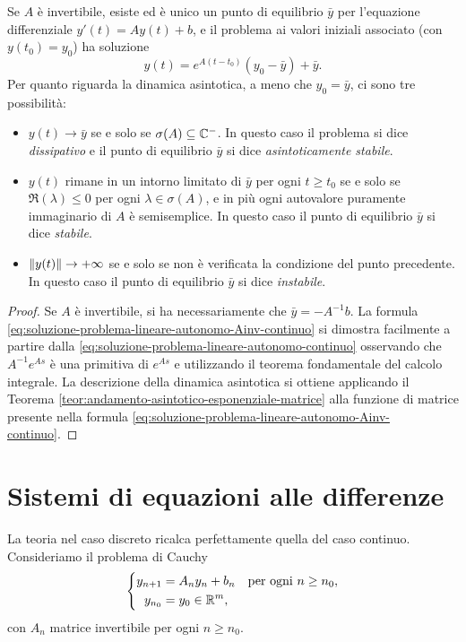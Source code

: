 \begin{teor} \label{teor:dinamica-asintotica-lineare-continuo}
Se $A$ è invertibile, esiste ed è unico un punto di equilibrio $\bar{y}$ per
l'equazione differenziale $y'(t) = A y(t) + b$, e il problema ai valori
iniziali associato (con $y(t_0) = y_0$) ha soluzione
\begin{equation} \label{eq:soluzione-problema-lineare-autonomo-Ainv-continuo}
y(t) = e^{A(t-t_0)} (y_0 - \bar{y}) + \bar{y}.
\end{equation}
Per quanto riguarda la dinamica asintotica, a meno che $y_0 = \bar{y}$,
ci sono tre possibilità:
\begin{itemize}
\item $y(t) \to \bar{y}$ se e solo se $\sigma(A) \subseteq \mathbb{C}^-$.
	In questo caso il problema si dice \emph{dissipativo} e il punto di
	equilibrio $\bar{y}$ si dice \emph{asintoticamente stabile}.
\item $y(t)$ rimane in un intorno limitato di $\bar{y}$ per ogni $t \geq t_0$
	se e solo se $\Re(\lambda) \leq 0$ per ogni $\lambda \in \sigma(A)$, e in più
	ogni autovalore puramente immaginario di $A$ è semisemplice.
	In questo caso il punto di equilibrio $\bar{y}$ si dice \emph{stabile}.
\item $\left\lVert y(t)\right\rVert \to +\infty$ se e solo se non è verificata la condizione
	del punto precedente. In questo caso il punto di equilibrio $\bar{y}$
	si dice \emph{instabile}.
\end{itemize}
\end{teor}

\begin{proof}
Se $A$ è invertibile, si ha necessariamente che $\bar{y} = -A^{-1}b$.
La formula \eqref{eq:soluzione-problema-lineare-autonomo-Ainv-continuo}
si dimostra facilmente a partire dalla
\eqref{eq:soluzione-problema-lineare-autonomo-continuo} osservando che
$A^{-1}e^{As}$ è una primitiva di $e^{As}$ e utilizzando il teorema
fondamentale del calcolo integrale. La descrizione della dinamica asintotica
si ottiene applicando il Teorema \eqref{teor:andamento-asintotico-esponenziale-matrice}
alla funzione di matrice presente nella formula
\eqref{eq:soluzione-problema-lineare-autonomo-Ainv-continuo}.
\end{proof}

\section{Sistemi di equazioni alle differenze}

La teoria nel caso discreto ricalca perfettamente quella del caso continuo.
Consideriamo il problema di Cauchy
\begin{equation} \label{eq:problema-lineare-discreto}
\left\{
\begin{aligned}
y_{n+1} &= A_n y_n + b_n \quad \text{per ogni $n \geq n_0$}, \\
y_{n_0} &= y_0 \in \mathbb{R}^m,
\end{aligned}
\right.
\end{equation}
con $A_n$ matrice invertibile per ogni $n \geq n_0$.

